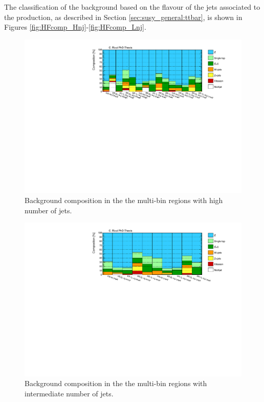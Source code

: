 The classification of the \ttbar background based on the flavour of the jets associated to the 
\ttbar production, as described in Section \ref{sec:susy_general:ttbar}, is shown in Figures 
\ref{fig:HFcomp_Hnj}-\ref{fig:HFcomp_Lnj}.

\begin{figure}[htbp]
\includegraphics[width=\textwidth]{figures/strong_prod/comp_plots/Hnj_bkg.pdf}
\caption{Background composition in the the multi-bin regions with high number of jets.}
	\label{fig:bkgcomp_Hnj}
\end{figure}

\begin{figure}[htbp]
\includegraphics[width=\textwidth]{figures/strong_prod/comp_plots/Inj_bkg.pdf}
\caption{Background composition in the the multi-bin regions with intermediate number of jets.}
	\label{fig:bkgcomp_Inj}
\end{figure}

